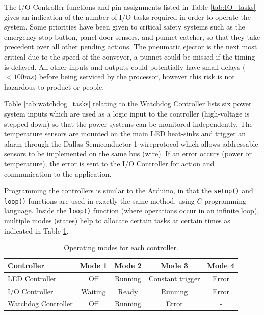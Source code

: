 \documentclass[fleqn,twoside,12pt]{report}
\begin{document}
The I/O Controller functions and pin assignments listed in Table \ref{tab:IO_tasks} gives an indication of the number of I/O tasks required in order to operate the system. Some priorities have been given to critical safety systems such as the emergency-stop button, panel door sensors, and punnet catcher, so that they take precedent over all other pending actions. The pneumatic ejector is the next most critical due to the speed of the conveyor, a punnet could be missed if the timing is delayed. All other inputs and outputs could potentially have small delays ($<100ms$) before being serviced by the processor, however this risk is not hazardous to product or people.


Table \ref{tab:watchdog_tasks} relating to the Watchdog Controller lists six power system inputs which are used as a logic input to the controller (high-voltage is stepped down) so that the power systems can be monitored independently. The temperature sensors are mounted on the main LED heat-sinks and trigger an alarm through the Dallas Semiconductor 1-wire\textregistered protocol which allows addressable sensors to be implemented on the same bus (wire). If an error occurs (power or temperature), the error is sent to the I/O Controller for action and communication to the application.

Programming the controllers is similar to the Arduino\texttrademark, in that the \texttt{setup()} and \texttt{loop()} functions are used in exactly the same method, using $C$ programming language. Inside the \texttt{loop()} function (where operations occur in an infinite loop), multiple modes (states) help to allocate certain tasks at certain times as indicated in Table \ref{tab:controllino_modes}.
	


\begin{table}[h]
	\centering
	\caption{Operating modes for each controller.}
	\label{tab:controllino_modes}
	\begin{tabular}{lcccc}
		\toprule
		\textbf{Controller} & \textbf{Mode 1} & \textbf{Mode 2} & \textbf{Mode 3} & \textbf{Mode 4} \\[8pt]
		\midrule
		LED Controller 		& Off & Running & Constant trigger & Error \\[4pt]
		I/O Controller 		& Waiting & Ready & Running & Error  \\[4pt]
		Watchdog Controller & Off & Running & Error & -  \\[4pt]
		\bottomrule
	\end{tabular}
\end{table}
\end{document}
